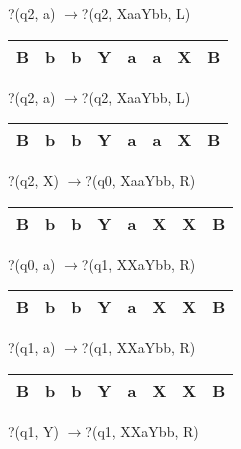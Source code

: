 \documentclass{article} %
\begin{document}
?(q2, a) $\to $?(q2, XaaYbb, L)

\noindent 

\begin{tabular}{|p{0.2in}|p{0.2in}|p{0.2in}|p{0.2in}|p{0.2in}|p{0.2in}|p{0.2in}|p{0.2in}|} \hline 
B & b & b & Y & a & a & X & B \\ \hline 
\end{tabular}

?(q2, a) $\to $?(q2, XaaYbb, L)

\noindent 

\begin{tabular}{|p{0.2in}|p{0.2in}|p{0.2in}|p{0.2in}|p{0.2in}|p{0.2in}|p{0.2in}|p{0.2in}|} \hline 
B & b & b & Y & a & a & X & B \\ \hline 
\end{tabular}

?(q2, X) $\to $?(q0, XaaYbb, R)

\noindent 

\begin{tabular}{|p{0.2in}|p{0.2in}|p{0.2in}|p{0.2in}|p{0.2in}|p{0.2in}|p{0.2in}|p{0.2in}|} \hline 
B & b & b & Y & a & X & X & B \\ \hline 
\end{tabular}

?(q0, a) $\to $?(q1, XXaYbb, R)

\noindent 

\begin{tabular}{|p{0.2in}|p{0.2in}|p{0.2in}|p{0.2in}|p{0.2in}|p{0.2in}|p{0.2in}|p{0.2in}|} \hline 
B & b & b & Y & a & X & X & B \\ \hline 
\end{tabular}

?(q1, a) $\to $?(q1, XXaYbb, R)

\noindent 

\begin{tabular}{|p{0.2in}|p{0.2in}|p{0.2in}|p{0.2in}|p{0.2in}|p{0.2in}|p{0.2in}|p{0.2in}|} \hline 
B & b & b & Y & a & X & X & B \\ \hline 
\end{tabular}

?(q1, Y) $\to $?(q1, XXaYbb, R)

\noindent 

\noindent 

\noindent 

\noindent 

\noindent 

\noindent 

\noindent 
\end{document}
